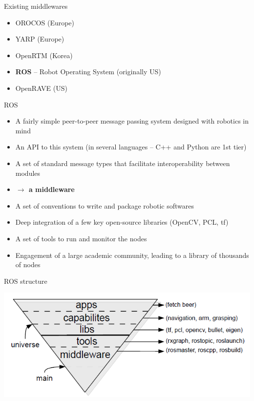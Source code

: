 \documentclass[compress]{beamer}
\begin{document}
\begin{frame}{Existing middlewares}
    \begin{itemize}
        \item OROCOS (Europe)
        \item YARP (Europe)
        \item OpenRTM (Korea)
        \item \textbf<2>{ROS} -- Robot Operating System (originally US)
        \item OpenRAVE (US)
    \end{itemize}
\end{frame}


\begin{frame}{ROS}
    \begin{itemize}
        \item<1-> A fairly simple peer-to-peer message passing system designed with robotics in
            mind
        \item<2-> An API to this system (in several languages -- C++ and Python are
            1st tier)
        \item<3-> A set of standard message types that facilitate interoperability between modules
        \item<4> \bf{$\rightarrow$ a middleware}
        \item<5-> A set of conventions to write and package robotic softwares
        \item<6-> Deep integration of a few key open-source libraries (OpenCV, PCL, tf)
        \item<7-> A set of tools to run and monitor the nodes
        \item<8-> Engagement of a large academic community, leading to a library of thousands of nodes
    \end{itemize}
\end{frame}

\begin{frame}{ROS structure}

    \begin{center}
        \includegraphics[width=\linewidth]{ros_structure}
    \end{center}
\end{frame}
\end{document}

